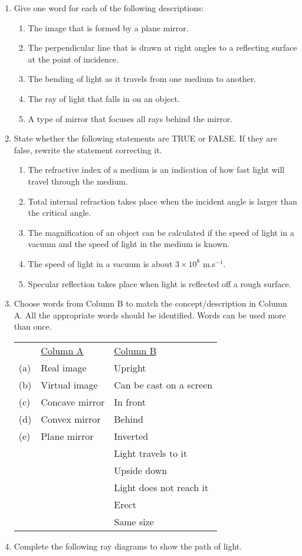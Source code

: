 \renewcommand{\labelenumii}{\arabic{enumi}.\arabic{enumii}} 
\begin{enumerate} 
\item{Give one word for each of the following descriptions: 
\begin{enumerate} 
\item{The image that is formed by a plane mirror.} 
\item{The perpendicular line that is drawn at right angles to a reflecting surface at the point of incidence.} 
\item{The bending of light as it travels from one medium to another.} 
\item{The ray of light that falls in on an object.} 
\item{A type of mirror that focuses all rays behind the mirror.} 
\end{enumerate} } 
\item{State whether the following statements are TRUE or FALSE. If they are false, rewrite the statement correcting it. 
\begin{enumerate} 
\item{The refractive index of a medium is an indication of how fast light will travel through the medium.} 
\item{Total internal refraction takes place when the incident angle is larger than the critical angle.} 
\item{The magnification of an object can be calculated if the speed of light in a vacuum and the speed of light in the medium is known.} 
\item{The speed of light in a vacuum is about $3\times 10^8$ m.s$^{-1}$.} \item{Specular reflection takes place when light is reflected off a rough surface.} 
\end{enumerate} } 
\item{Choose words from Column B to match the concept/description in Column A. All the appropriate words should be identified. Words can be used more than once. 

\begin{tabular}{lll} & \underline{Column A} & \underline{Column B}\\ (a) & Real image & Upright\\ (b) & Virtual image & Can be cast on a screen\\ (c) & Concave mirror & In front\\ (d) & Convex mirror & Behind\\ (e) & Plane mirror & Inverted\\ & & Light travels to it\\ & & Upside down\\ & & Light does not reach it\\ & & Erect\\ & & Same size\\ \end{tabular} } 
\item{Complete the following ray diagrams to show the path of light.

}
\end{enumerate}
